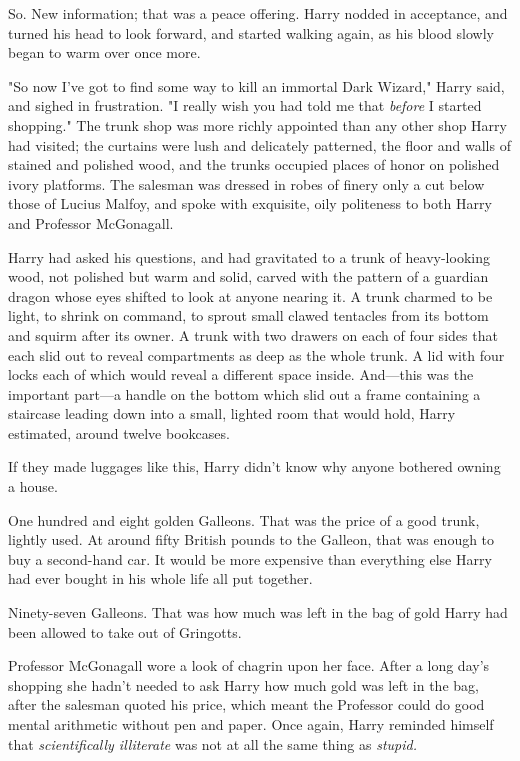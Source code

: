 So. New information; that was a peace offering. Harry nodded in acceptance, and
turned his head to look forward, and started walking again, as his blood slowly
began to warm over once more.

"So now I've got to find some way to kill an immortal Dark Wizard," Harry said,
and sighed in frustration. "I really wish you had told me that \emph{before} I
started shopping."
\sbreak
The trunk shop was more richly appointed than any other shop Harry had visited;
the curtains were lush and delicately patterned, the floor and walls of stained
and polished wood, and the trunks occupied places of honor on polished ivory
platforms. The salesman was dressed in robes of finery only a cut below those
of Lucius Malfoy, and spoke with exquisite, oily politeness to both Harry and
Professor McGonagall.

Harry had asked his questions, and had gravitated to a trunk of heavy-looking
wood, not polished but warm and solid, carved with the pattern of a guardian
dragon whose eyes shifted to look at anyone nearing it. A trunk charmed to be
light, to shrink on command, to sprout small clawed tentacles from its bottom
and squirm after its owner. A trunk with two drawers on each of four sides that
each slid out to reveal compartments as deep as the whole trunk. A lid with
four locks each of which would reveal a different space inside. And—this was
the important part—a handle on the bottom which slid out a frame containing a
staircase leading down into a small, lighted room that would hold, Harry
estimated, around twelve bookcases.

If they made luggages like this, Harry didn't know why anyone bothered owning a
house.

One hundred and eight golden Galleons. That was the price of a good trunk,
lightly used. At around fifty British pounds to the Galleon, that was enough to
buy a second-hand car. It would be more expensive than everything else Harry
had ever bought in his whole life all put together.

Ninety-seven Galleons. That was how much was left in the bag of gold Harry had
been allowed to take out of Gringotts.

Professor McGonagall wore a look of chagrin upon her face. After a long day's
shopping she hadn't needed to ask Harry how much gold was left in the bag,
after the salesman quoted his price, which meant the Professor could do good
mental arithmetic without pen and paper. Once again, Harry reminded himself
that \emph{scientifically illiterate} was not at all the same thing as
\emph{stupid.}

